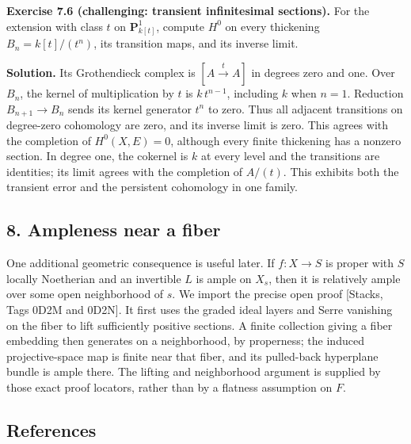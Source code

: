 \documentclass[11pt]{article}
\begin{document}
\textbf{Exercise 7.6 (challenging: transient infinitesimal sections).}
For the extension with class \(t\) on \(\mathbf P^1_{k[t]}\), compute
\(H^0\) on every thickening \(B_n=k[t]/(t^n)\), its transition maps, and
its inverse limit.

\textbf{Solution.} Its Grothendieck complex is \([A\xrightarrow{t}A]\)
in degrees zero and one. Over \(B_n\), the kernel of multiplication by
\(t\) is \(k\,t^{n-1}\), including \(k\) when \(n=1\). Reduction
\(B_{n+1}\to B_n\) sends its kernel generator \(t^n\) to zero. Thus all
adjacent transitions on degree-zero cohomology are zero, and its inverse
limit is zero. This agrees with the completion of \(H^0(X,E)=0\),
although every finite thickening has a nonzero section. In degree one,
the cokernel is \(k\) at every level and the transitions are identities;
its limit agrees with the completion of \(A/(t)\). This exhibits both
the transient error and the persistent cohomology in one family.

\subsection{8. Ampleness near a fiber}\label{ampleness-near-a-fiber}

One additional geometric consequence is useful later. If \(f:X\to S\) is
proper with \(S\) locally Noetherian and an invertible \(L\) is ample on
\(X_s\), then it is relatively ample over some open neighborhood of
\(s\). We import the precise open proof {[}Stacks, Tags 0D2M and
0D2N{]}. It first uses the graded ideal layers and Serre vanishing on
the fiber to lift sufficiently positive sections. A finite collection
giving a fiber embedding then generates on a neighborhood, by
properness; the induced projective-space map is finite near that fiber,
and its pulled-back hyperplane bundle is ample there. The lifting and
neighborhood argument is supplied by those exact proof locators, rather
than by a flatness assumption on \(F\).

\subsection{References}\label{references}
\end{document}
